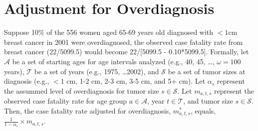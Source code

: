\documentclass[11pt,letterpaper]{article}
\theoremstyle{plain}
\theoremstyle{remark}
\numberwithin{equation}{section}
\begin{document}
\section{Adjustment for Overdiagnosis}
Suppose 10\% of the 556 women aged 65-69 years old diagnosed with $<1$cm
breast cancer in 2001 were overdiagnosed, the observed case fatality
rate from breast cancer (22/5099.5) would become 22/[5099.5 -
0.10*5099.5].  Formally, let $\mathcal{A}$ be a set of starting ages
for age intervals analyzed (e.g., 40, 45, \dots, $\omega=100$ years), $\mathcal{T}$ be a set of
years (e.g., 1975, \dots 2002), and $\mathcal{S}$ be a set of tumor
sizes at diagnosis (e.g., $<1$ cm, 1-2 cm, 2-3 cm, 3-5 cm, and 5+ cm).
Let $\alpha_s$ represent the assummed level of overdiagnosis for tumor
size $s\in\mathcal{S}$.  Let $m_{a,t,s}$ represent the observed case
fatality rate for age group $a \in \mathcal{A}$, year $t \in
\mathcal{T}$, and tumor size $s \in \mathcal{S}$.  Then, the case
fatality rate adjusted for overdiagnosis, $m^*_{a,t,s}$, equals,
$\frac{1}{1-\alpha_s} \times m_{a,t,s}$.
\end{document}
